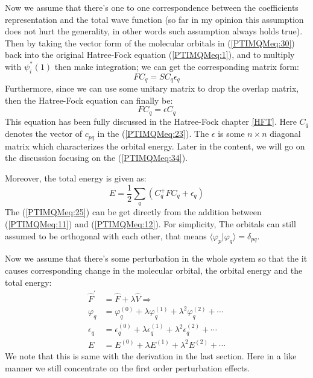 Now we assume that there's one to one correspondence between the
coefficients representation and the total wave function (so far in
my opinion this assumption does not hurt the generality, in other
words such assumption always holds true). Then by taking the vector
form of the molecular orbitals in (\ref{PTIMQMeq:30}) back into the
original Hatree-Fock equation (\ref{PTIMQMeq:1}), and to multiply
with $\psi_{i}^{*}(1)$ then make integration; we can get the
corresponding matrix form:
\begin{equation}\label{PTIMQMeq:24}
FC_{q} = SC_{q}\epsilon_{q}
\end{equation}
Furthermore, since we can use some unitary matrix to drop the
overlap matrix, then the Hatree-Fock equation can finally be:
\begin{equation}\label{PTIMQMeq:34}
FC_{q} = \epsilon C_{q}
\end{equation}
This equation has been fully discussed in the Hatree-Fock chapter
\ref{HFT}. Here $C_{q}$ denotes the vector of $c_{pq}$ in the
(\ref{PTIMQMeq:23}). The $\epsilon$ is some $n\times n$ diagonal
matrix which characterizes the orbital energy. Later in the content,
we will go on the discussion focusing on the (\ref{PTIMQMeq:34}).

Moreover, the total energy is given as:
\begin{equation}\label{PTIMQMeq:25}
E = \frac{1}{2}\sum_{q}(C_{q}^{+}FC_{q} + \epsilon_{q})
\end{equation}
The (\ref{PTIMQMeq:25}) can be get directly from the addition
between (\ref{PTIMQMeq:11}) and (\ref{PTIMQMeq:12}). For simplicity,
The orbitals can still assumed to be orthogonal with each other,
that means $\langle\varphi_{p}|\varphi_{q}\rangle = \delta_{pq}$.

Now we assume that there's some perturbation in the whole system so
that the it causes corresponding change in the molecular orbital,
the orbital energy and the total energy:
\begin{align}\label{}
\hat{F}^{'} &= \hat{F} + \lambda \hat{V} \Rightarrow \nonumber \\
\varphi_{q} &= \varphi^{(0)}_{q} + \lambda\varphi^{(1)}_{q} +
\lambda^{2}\varphi^{(2)}_{q} + \cdots \nonumber \\
\epsilon_{q} &= \epsilon^{(0)}_{q} + \lambda\epsilon^{(1)}_{q} +
\lambda^{2}\epsilon^{(2)}_{q} + \cdots \nonumber \\
E &= E^{(0)} + \lambda E^{(1)} + \lambda^{2}E^{(2)} + \cdots
\end{align}
We note that this is same with the derivation in the last section.
Here in a like manner we still concentrate on the first order
perturbation effects.

